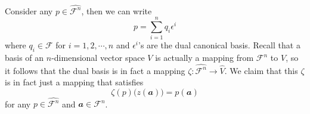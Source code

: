 \documentclass[math, code]{amznotes}
\theoremstyle{remark}
\begin{document}
Consider any $p \in \hat{\mathcal{F}^n}$, then we can write
\begin{equation*}
    p = \sum_{i = 1}^{n}q_i\epsilon^i
\end{equation*} 
where $q_i \in \mathcal{F}$ for $i = 1, 2, \cdots, n$ and $\epsilon^i$'s are the dual canonical basis. Recall that a basis of an $n$-dimensional vector space $V$ is actually a mapping from $\mathcal{F}^n$ to $V$, so it follows that the dual basis is in fact a mapping $\zeta \colon \hat{\mathcal{F}^n} \to \hat{V}$. We claim that this $\zeta$ is in fact just a mapping that satisfies 
\begin{equation*}
    \zeta(p)\bigl(z(\mathbfit{a})\bigr) = p(\mathbfit{a})
\end{equation*}
for any $p \in \hat{\mathcal{F}^n}$ and $\mathbfit{a} \in \mathcal{F}^n$. 
\end{document}
